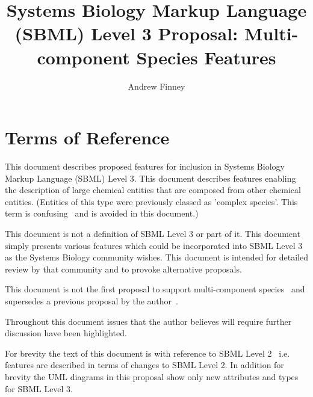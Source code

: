 \documentclass{cekarticle}
\begin{document}

\title{Systems Biology Markup Language (SBML) Level 3 Proposal: Multi-component Species Features}

\author{Andrew Finney}


\maketitlepage


\section{Terms of Reference}
\label{sec:t-o-r}

This document describes proposed features for inclusion in
Systems Biology Markup Language (SBML) Level 3. This document
describes features enabling the description of large chemical entities that are composed
from other chemical entities.  (Entities of this type were previously classed as 'complex species'.
This term is confusing~\citep{phair:2003} and is avoided in this document.)  

This document is not a definition of SBML Level 3 or part of it.
This document simply presents various features which could be
incorporated into SBML Level 3 as the Systems Biology community
wishes.  This document is intended for detailed review by that
community and to provoke alternative proposals.  

This document is not the first proposal to support multi-component species~\citep{lenovere:2002}
and supersedes a previous proposal by the author~\citep{finney:2001f}.

Throughout this
document issues that the author believes will require further
discussion have been highlighted.

For brevity the text of this document is with reference to SBML
Level 2~\citep{finney:2002f} i.e. features are described in terms
of changes to SBML Level 2.  In addition for brevity the UML diagrams in this proposal
show only new attributes and types for SBML Level 3.  
\end{document}
